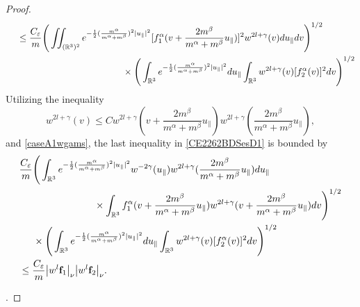 \documentclass[reqno]{amsart}
\numberwithin{equation}{section}
\numberwithin{equation}{section}
\begin{document}
\begin{proof}
\begin{align}
			&\hspace{0.4cm}\leq \frac{C_\varepsilon}{m} \Bigg(\iint_{(\mathbb{R}^3)^2}e^{-\frac{1}{2}(\frac{m^\alpha}{m^\alpha+m^\beta})^2|u_{\parallel}|^2}[f^\alpha_1(v + \frac{2m^{\beta}}{m^{\alpha}+m^{\beta}}u_{\parallel})]^{2} w^{2l+\gamma}(v)du_{\parallel}dv\Bigg)^{1/2}\label{CE2262BDSesD1}\\
			&\hspace{4.4cm}\times  \Bigg(\int_{\mathbb{R}^3}e^{-\frac{1}{2}(\frac{m^\alpha}{m^\alpha+m^\beta})^2|u_{\parallel}|^2} du_{\parallel}\int_{\mathbb{R}^3}w^{2l+\gamma}(v)[f^\alpha_2(v)]^2dv\Bigg)^{1/2}\notag
		\end{align}
		Utilizing the inequality 
		\begin{equation}\label{convertvvvkgbc}
			w^{2l+\gamma}(v)\leq C w^{2l+\gamma}(v+ \frac{2m^{\beta}}{m^{\alpha}+m^{\beta}}u_{\parallel}) w^{2l+\gamma}( \frac{2m^{\beta}}{m^{\alpha}+m^{\beta}}u_{\parallel}),
		\end{equation}
		and \eqref{caseA1wgams},
		the last inequality in \eqref{CE2262BDSesD1} is bounded by
		\begin{equation*}
			\begin{split}
				& \frac{C_\varepsilon}{m} \Bigg(\int_{\mathbb{R}^3}e^{-\frac{1}{2}(\frac{m^\alpha}{m^\alpha+m^\beta})^2|u_{\parallel}|^2}w^{-2\gamma}(u_\parallel)w^{2l+\gamma}( \frac{2m^{\beta}}{m^{\alpha}+m^{\beta}}u_{\parallel})du_{\parallel}\\
				&\hspace{2.7cm}\times\int_{\mathbb{R}^3}f^\alpha_1(v + \frac{2m^{\beta}}{m^{\alpha}+m^{\beta}}u_{\parallel}) w^{2l+\gamma}(v + \frac{2m^{\beta}}{m^{\alpha}+m^{\beta}}u_{\parallel})dv\Bigg)^{1/2}\\
				&\hspace{0.5cm}\times  \Bigg(\int_{\mathbb{R}^3}e^{-\frac{1}{2}(\frac{m^\alpha}{m^\alpha+m^\beta})^2|u_{\parallel}|^2} du_{\parallel}\int_{\mathbb{R}^3}w^{2l+\gamma}(v)[f^\alpha_2(v)]^2dv\Bigg)^{1/2}\\
				&\leq \frac{C_\varepsilon}{m} \big|w^{l}\mathbf{f}_1\big|_\nu \big|w^{l} \mathbf{f}_2\big|_\nu.
			\end{split}
		\end{equation*}

		
		
		.
		

\end{proof}
\end{document}
